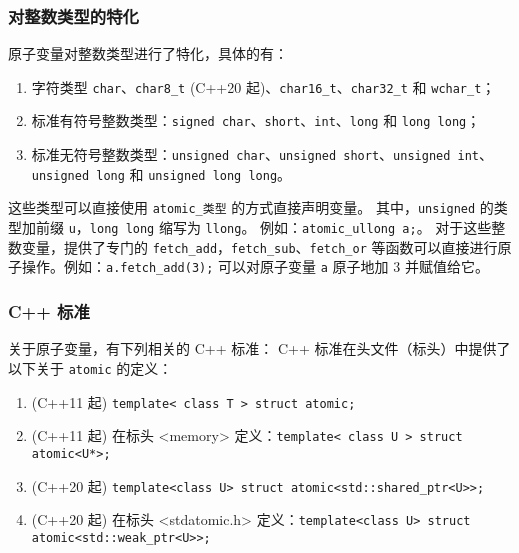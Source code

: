 \subsubsection{对整数类型的特化}
原子变量对整数类型进行了特化，具体的有：
\begin{enumerate}
\item 字符类型 \verb`char`、\verb`char8_t` (C++20 起)、\verb`char16_t`、\verb`char32_t` 和 \verb`wchar_t`；
\item 标准有符号整数类型：\verb`signed char`、\verb`short`、\verb`int`、\verb`long` 和 \verb`long long`；
\item 标准无符号整数类型：\verb`unsigned char`、\verb`unsigned short`、\verb`unsigned int`、\verb`unsigned long` 和 \verb`unsigned long long`。
\end{enumerate}
这些类型可以直接使用 \verb`atomic_类型` 的方式直接声明变量。
其中，\verb`unsigned` 的类型加前缀 \verb`u`，\verb`long long` 缩写为 \verb`llong`。
例如：\verb`atomic_ullong a;`。
对于这些整数变量，提供了专门的 \verb`fetch_add`，\verb`fetch_sub`、\verb`fetch_or` 等函数可以直接进行原子操作。例如：\verb`a.fetch_add(3);` 可以对原子变量 \verb`a` 原子地加 $3$ 并赋值给它。

\subsubsection{C++ 标准}
关于原子变量，有下列相关的 C++ 标准：
C++ 标准在头文件（标头）中提供了以下关于 \verb`atomic` 的定义：
\begin{enumerate}
\item (C++11 起) \verb`template< class T > struct atomic;`
\item (C++11 起) 在标头 <memory> 定义：\verb`template< class U > struct atomic<U*>;`
\item (C++20 起) \verb`template<class U> struct atomic<std::shared_ptr<U>>;`
\item (C++20 起) 在标头 <stdatomic.h> 定义：\verb`template<class U> struct atomic<std::weak_ptr<U>>;`
\end{enumerate}

